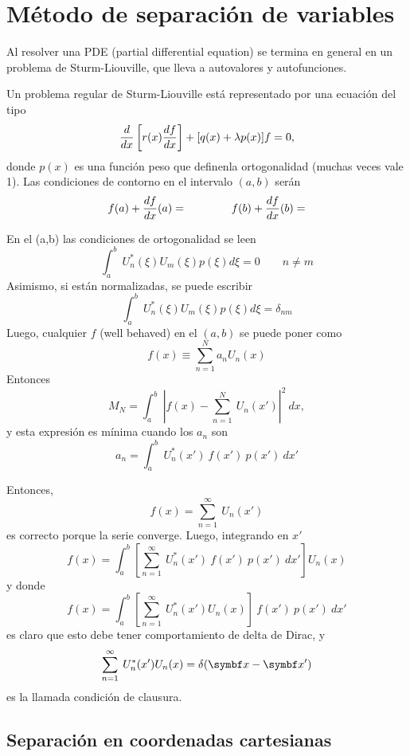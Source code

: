 \documentclass[10pt,oneside]{CBFT_book}
\begin{document}
\chapter{Método de separación de variables}

Al resolver una PDE (partial differential equation) se termina en general en un problema de
Sturm-Liouville, que lleva a autovalores y autofunciones.

Un problema regular de Sturm-Liouville está representado por una ecuación del tipo
\[
	\frac{d^{\hspace{-0.05em}} {}}{d {x}^{\hspace{-0.05em}}}\left[ r(x) \frac{d^{\hspace{-0.05em}} {f}}{d {x}^{\hspace{-0.05em}}} \right] + [ q(x) + \lambda p(x)] f = 0,
\]
donde $p(x)$ es una función peso que definenla ortogonalidad (muchas veces vale 1).
Las condiciones de contorno en el intervalo $(a,b)$ serán
\[	
	f(a) + \frac{d^{\hspace{-0.05em}} {f}}{d {x}^{\hspace{-0.05em}}}(a) = \qquad \qquad f(b) + \frac{d^{\hspace{-0.05em}} {f}}{d {x}^{\hspace{-0.05em}}}(b) =
\]

En el (a,b) las condiciones de ortogonalidad se leen
\[
	\int_a^b \: U_n^*(\xi) U_m(\xi) p(\xi) d\xi = 0 \qquad n \neq m
\]
Asimismo, si están normalizadas, se puede escribir
\[
	\int_a^b \: U_n^*(\xi) U_m(\xi) p(\xi) d\xi = \delta_{nm}
\]
Luego, cualquier $f$ (well behaved) en el $(a,b)$ se puede poner como
\[
	f(x) \equiv \sum_{n=1}^N a_n U_n(x)
\]
Entonces
\[
	M_N = \int_a^b \: \left| f(x) - \sum_{n=1}^N \: U_n(x') \right|^2 \: dx,
\]
y esta expresión es mínima cuando los $a_n$ son
\[
	a_n = \int_a^b \: U_n^*(x') \: f(x') \: p(x') \: dx'
\]

Entonces,
\[
	f(x) = \sum_{n=1}^\infty \: U_n(x')
\]
es correcto porque la serie converge. Luego, integrando en $x'$
\[
	f(x) = \int_a^b \left[ \sum_{n=1}^\infty \: U_n^*(x') \: f(x') \: p(x') \: dx' \right] U_n(x)
\]
y donde
\[
	f(x) = \int_a^b \left[ \sum_{n=1}^\infty \: U_n^*(x') U_n(x) \right] \: f(x') \: p(x') \: dx'
\]
es claro que esto debe tener comportamiento de delta de Dirac, y
\[
	\sum_{n=1}^\infty \: U_n^*(x') U_n(x) = \delta(\vbx-\vbx')
\]
es la llamada condición de clausura.

\section{Separación en coordenadas cartesianas}
\end{document}

